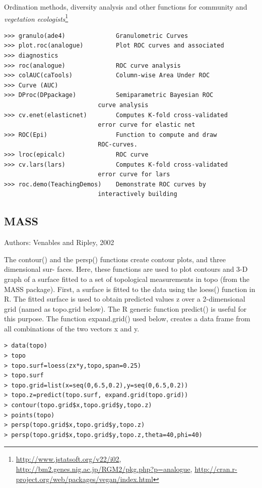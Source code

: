 Ordination methods, diversity analysis and other functions for
community and {\it vegetation ecologists}\footnote{\url{
http://www.jstatsoft.org/v22/i02}, \url{
http://bm2.genes.nig.ac.jp/RGM2/pkg.php?p=analogue}, \url{
http://cran.r-project.org/web/packages/vegan/index.html}}
\begin{lstlisting}
>>> granulo(ade4)              Granulometric Curves
>>> plot.roc(analogue)         Plot ROC curves and associated
>>> diagnostics
>>> roc(analogue)              ROC curve analysis
>>> colAUC(caTools)            Column-wise Area Under ROC
>>> Curve (AUC)
>>> DProc(DPpackage)           Semiparametric Bayesian ROC
                          curve analysis
>>> cv.enet(elasticnet)        Computes K-fold cross-validated
                          error curve for elastic net
>>> ROC(Epi)                   Function to compute and draw
                          ROC-curves.
>>> lroc(epicalc)              ROC curve
>>> cv.lars(lars)              Computes K-fold cross-validated
                          error curve for lars
>>> roc.demo(TeachingDemos)    Demonstrate ROC curves by
                          interactively building 
\end{lstlisting}
  
\subsection{MASS}
\label{sec:mass}

Authors: Venables and Ripley, 2002

The contour() and the persp() functions create contour plots, and three dimensional sur-
faces. Here, these functions are used to plot contours and 3-D graph of a surface fitted to a
set of topological measurements in topo (from the MASS package). First, a surface is fitted
to the data using the loess() function in R. The fitted surface is used to obtain predicted
values z over a 2-dimensional grid (named as topo.grid below). The R generic function
predict() is useful for this purpose. The function expand.grid() used below, creates a
data frame from all combinations of the two vectors x and y.
\begin{lstlisting}
> data(topo)
> topo
> topo.surf=loess(zx*y,topo,span=0.25)
> topo.surf
> topo.grid=list(x=seq(0,6.5,0.2),y=seq(0,6.5,0.2))
> topo.z=predict(topo.surf, expand.grid(topo.grid))
> contour(topo.grid$x,topo.grid$y,topo.z)
> points(topo)
> persp(topo.grid$x,topo.grid$y,topo.z)
> persp(topo.grid$x,topo.grid$y,topo.z,theta=40,phi=40)
\end{lstlisting}

